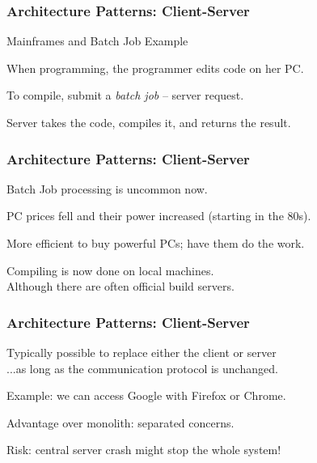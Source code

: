 \begin{frame}
\frametitle{Architecture Patterns: Client-Server}

\begin{changemargin}{1cm}
Mainframes and Batch Job Example

When programming, the programmer edits code on her PC.

To compile, submit a \textit{batch job} -- server request.

Server takes the code, compiles it, and returns the result.

\end{changemargin}
\end{frame}

\begin{frame}
\frametitle{Architecture Patterns: Client-Server}

\begin{changemargin}{1cm}
Batch Job processing is uncommon now.

PC prices fell and their power increased (starting in the 80s).

More efficient to buy powerful PCs; have them do the work.

Compiling is now done on local machines.\\
\quad Although there are often official build servers.

\end{changemargin}
\end{frame}

\begin{frame}
\frametitle{Architecture Patterns: Client-Server}

\begin{changemargin}{1cm}
Typically possible to replace either the client or server\\
\quad ...as long as the communication protocol is unchanged.

Example: we can access Google with Firefox or Chrome.

Advantage over monolith: separated concerns.

Risk: central server crash might stop the whole system! 

\end{changemargin}
\end{frame}

